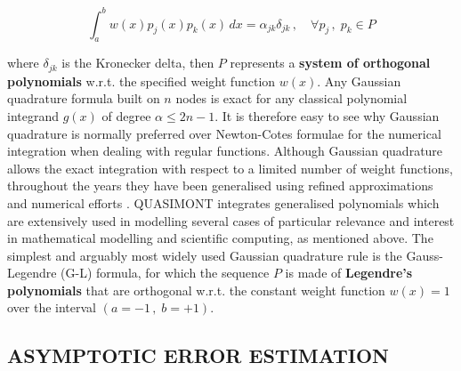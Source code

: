 \documentclass[a4paper, twosided]{book}
\begin{document}
\begin{equation}\label{eq1.6}
    \int_a^b w(x)p_j(x)p_k(x)\,dx = \alpha_{jk}\delta_{jk}\,,\quad\forall p_j\,,\;p_k\in P
\end{equation}

\noindent
where $\delta_{jk}$ is the Kronecker delta, then $P$ represents a \color{poliDarkBlue} \textbf{system of orthogonal polynomials} \color{black} w.r.t. the specified weight function $w(x)$. Any Gaussian quadrature formula built on  $n$ nodes is exact for any classical polynomial integrand $g(x)$ of degree $\alpha\leq 2n-1$. It is therefore easy to see why Gaussian quadrature is normally preferred over Newton-Cotes formulae for the numerical integration when dealing with regular functions. Although Gaussian quadrature allows the exact integration with respect to a limited number of weight functions, throughout the years they have been generalised using refined approximations and numerical efforts \cite{Gautschi94}. QUASIMONT integrates generalised polynomials which are extensively used in modelling several cases of particular relevance and interest in mathematical modelling and scientific computing, as mentioned above. The simplest and arguably most widely used Gaussian quadrature rule is the Gauss-Legendre (G-L) formula, for which the sequence $P$ is made of \color{poliDarkBlue} \textbf{Legendre's polynomials} \color{black} that are orthogonal w.r.t. the constant weight function $w(x)=1$ over the interval $(a=-1\,,\;b=+1)$.

\subsection[Asymptotic error estimation]{\changefont ASYMPTOTIC ERROR ESTIMATION \color{black}}\label{SubSec1.2.3}
\end{document}
